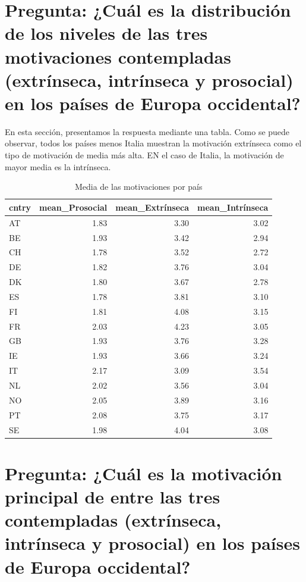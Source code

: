 \documentclass{article}
\begin{document}
\section {Pregunta: ¿Cuál es la distribución de los niveles de las tres motivaciones contempladas (extrínseca, intrínseca y prosocial) en los países de Europa occidental?}

En esta sección, presentamos la respuesta mediante una tabla.
Como se puede observar, todos los países menos Italia muestran la motivación extrínseca como el tipo de motivación de media más alta. EN el caso de Italia, la motivación de mayor media es la intrínseca.

\begin{table}

\caption{Media de las motivaciones por país}
\centering
\begin{tabular}[t]{lrrr}
\toprule
cntry & mean\_Prosocial & mean\_Extrínseca & mean\_Intrínseca\\
\midrule
AT & 1.83 & 3.30 & 3.02\\
BE & 1.93 & 3.42 & 2.94\\
CH & 1.78 & 3.52 & 2.72\\
DE & 1.82 & 3.76 & 3.04\\
DK & 1.80 & 3.67 & 2.78\\
\addlinespace
ES & 1.78 & 3.81 & 3.10\\
FI & 1.81 & 4.08 & 3.15\\
FR & 2.03 & 4.23 & 3.05\\
GB & 1.93 & 3.76 & 3.28\\
IE & 1.93 & 3.66 & 3.24\\
\addlinespace
IT & 2.17 & 3.09 & 3.54\\
NL & 2.02 & 3.56 & 3.04\\
NO & 2.05 & 3.89 & 3.16\\
PT & 2.08 & 3.75 & 3.17\\
SE & 1.98 & 4.04 & 3.08\\
\bottomrule
\end{tabular}
\end{table}





\section {Pregunta: ¿Cuál es la motivación principal de entre las tres contempladas (extrínseca, intrínseca y prosocial) en los países de Europa occidental?}
\end{document}
